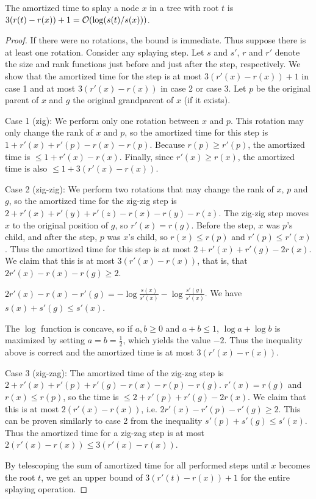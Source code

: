 \begin{lemma}
The amortized time to splay a node $x$ in a tree with root
$t$ is $3(r(t)-r(x))+1 = \mathcal{O}(\log(s(t)/s(x)))$.
\end{lemma}
\begin{proof}
If there were no rotations, the bound is immediate. Thus suppose there is at
least one rotation. Consider any splaying step.
Let $s$ and $s'$, $r$ and $r'$ denote the size and rank functions just before
and just after the step, respectively. We show that the amortized time for
the step is at most $3(r'(x)-r(x))+1$ in case 1 and at most $3(r'(x)-r(x))$
in case 2 or case 3. Let $p$ be the original parent of $x$ and $g$ the original
grandparent of $x$ (if it exists).

Case 1 (zig):
	We perform only one rotation between $x$ and $p$.
	This rotation may only change the rank of $x$ and $p$, so
	the amortized time for this step is $1 + r'(x) + r'(p) - r(x) - r(p)$.
	Because $r(p)\geq r'(p)$, the amortized time is $\leq 1+r'(x)-r(x)$.
	Finally, since $r'(x)\geq r(x)$, the amortized time is also
	$\leq 1+3(r'(x)-r(x))$.

Case 2 (zig-zig):
	We perform two rotations that may change the rank of $x$, $p$
	and $g$, so the amortized time for the zig-zig step is
	$2+r'(x)+r'(y)+r'(z)-r(x)-r(y)-r(z)$. The zig-zig step
	moves $x$ to the original position of $g$, so $r'(x)=r(g)$.
	Before the step, $x$ was $p$'s child, and after the step,
	$p$ was $x$'s child, so $r(x)\leq r(p)$ and $r'(p)\leq r'(x)$.
	Thus the amortized time for this step is at most $2+r'(x)+r'(g)-2r(x)$.
	We claim that this is at most $3(r'(x)-r(x))$, that is, that
	$2r'(x)-r(x)-r(g)\geq 2$.

	$2r'(x)-r(x)-r'(g)=-\log\frac{s(x)}{s'(x)}-\log\frac{s'(g)}{s'(x)}$.
	We have $s(x)+s'(g)\leq s'(x)$.

	The $\log$ function is concave, so
	if $a,b\geq 0$ and $a+b\leq 1$, $\log a + \log b$ is maximized
	by setting $a = b = \frac{1}{2}$, which yields the value $-2$.
	Thus the inequality above is correct and the amortized time is
	at most $3(r'(x)-r(x))$.

Case 3 (zig-zag):
	The amortized time of the zig-zag step is
	$2+r'(x)+r'(p)+r'(g)-r(x)-r(p)-r(g)$. $r'(x)=r(g)$ and $r(x)\leq r(p)$,
	so the time is $\leq 2+r'(p)+r'(g)-2r(x)$.
	We claim that this is at most $2(r'(x)-r(x))$, i.e.
	$2r'(x)-r'(p)-r'(g)\geq 2$. This can be proven
	similarly to case 2 from the inequality $s'(p)+s'(g)\leq s'(x)$.
	Thus the amortized time for a zig-zag step is at most
	$2(r'(x)-r(x))\leq 3(r'(x)-r(x))$.

By telescoping the sum of amortized time for all performed steps until
$x$ becomes the root $t$, we get an upper bound of $3(r'(t)-r(x))+1$
for the entire splaying operation.
\end{proof}

